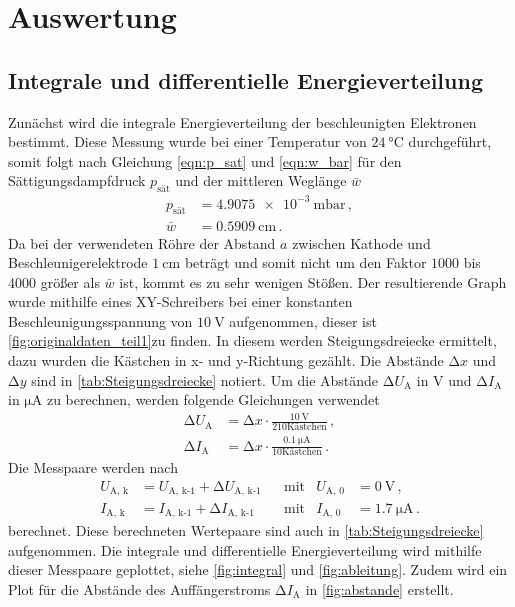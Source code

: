\section{Auswertung}
\label{sec:Auswertung}

\subsection{Integrale und differentielle Energieverteilung}
Zunächst wird die integrale Energieverteilung der beschleunigten Elektronen bestimmt.
Diese Messung wurde bei einer Temperatur von $\SI{24}{\celsius}$ durchgeführt, somit folgt nach Gleichung \eqref{eqn:p_sat} und \eqref{eqn:w_bar}
für den Sättigungsdampfdruck $p_\text{sät}$ und der mittleren Weglänge $\bar{w}$ 
\begin{align*}
    p_\text{sät} &= \SI{4.9075e-3}{\milli\bar} \, , \\
    \bar{w} &= \SI{0.5909}{\centi\metre} \, .
\end{align*}
Da bei der verwendeten Röhre der Abstand $a$ zwischen Kathode und Beschleunigerelektrode $\SI{1}{\centi\metre}$ beträgt und somit nicht um den Faktor $1000$ bis $4000$ größer als $\bar{w}$ ist, kommt es zu sehr wenigen Stößen.
\noindent
Der resultierende Graph wurde mithilfe eines XY-Schreibers bei einer konstanten Beschleunigungsspannung von $\SI{10}{\volt}$ aufgenommen, dieser ist \autoref{fig:originaldaten_teil1}zu finden.
In diesem werden Steigungsdreiecke ermittelt, dazu wurden die Kästchen in x- und y-Richtung gezählt.
Die Abstände $\increment x$ und $\increment y$ sind in \autoref{tab:Steigungsdreiecke} notiert.
Um die Abstände $\increment U_\text{A}$ in $\si{\volt}$ und $\increment I_\text{A}$ in $\si{\micro\ampere}$ zu berechnen, werden folgende Gleichungen verwendet
\begin{align*}
    \increment U_\text{A} &= \increment x \cdot \frac{\SI{10}{\volt}}{210 \text{Kästchen}} \, , \\
    \increment I_\text{A} &= \increment x \cdot \frac{\SI{0.1}{\micro\ampere}}{10 \text{Kästchen}} \, .
\end{align*}
Die Messpaare werden nach
\begin{align*}
    U_\text{A, k} &= U_\text{A, k-1} + \increment U_\text{A, k-1}&  &\text{mit} &U_\text{A, 0} &= \SI{0}{\volt} \, , \\
    I_\text{A, k} &= I_\text{A, k-1} + \increment I_\text{A, k-1}&  &\text{mit} &I_\text{A, 0} &= \SI{1.7}{\micro\ampere} \, .
\end{align*}
berechnet. Diese berechneten Wertepaare sind auch in \autoref{tab:Steigungsdreiecke} aufgenommen.
\noindent
Die integrale und differentielle Energieverteilung wird mithilfe dieser Messpaare geplottet, siehe \autoref{fig:integral} und \autoref{fig:ableitung}.
Zudem wird ein Plot für die Abstände des Auffängerstroms $\increment I_\text{A}$ in \autoref{fig:abstande} erstellt.

